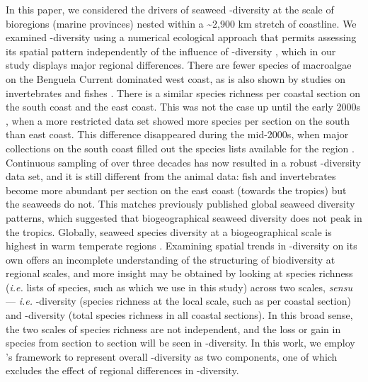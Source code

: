 \documentclass[utf8]{frontiersSCNS} %
\begin{document}
In this paper, we considered the drivers of seaweed \textbeta-diversity at the scale of bioregions (marine provinces) nested within a \textasciitilde{}2,900 km stretch of coastline. We examined \textbeta-diversity using a numerical ecological approach that permits assessing its spatial pattern independently of the influence of \textalpha-diversity \citep{Baselga2013}, which in our study displays major regional differences. There are fewer species of macroalgae on the Benguela Current dominated west coast, as is also shown by studies on invertebrates and fishes \citep{Thandar1989,Turpie2000}. There is a similar species richness per coastal section on the south coast and the east coast. This was not the case up until the early 2000s \citep{Bolton2002}, when a more restricted data set showed more species per section on the south than east coast. This difference disappeared during the mid-2000s, when major collections on the south coast filled out the species lists available for the region \citep{DeClerck2005}. Continuous sampling of over three decades has now resulted in a robust \textalpha-diversity data set, and it is still different from the animal data: fish and invertebrates become more abundant per section on the east coast (towards the tropics) but the seaweeds do not. This matches previously published global seaweed diversity patterns, which suggested that biogeographical seaweed diversity does not peak in the tropics. Globally, seaweed species diversity at a biogeographical scale is highest in warm temperate regions \citep{Bolton1994,Santelices2009chapter}. Examining spatial trends in \textalpha-diversity on its own offers an incomplete understanding of the structuring of biodiversity at regional scales, and more insight may be obtained by looking at species richness (\emph{i.e.} lists of species, such as which we use in this study) across two scales, \emph{sensu} \citet{Whittaker1972} --- \emph{i.e.} \textalpha-diversity (species richness at the local scale, such as per coastal section) and \textgamma-diversity (total species richness in all coastal sections). In this broad sense, the two scales of species richness are not independent, and the loss or gain in species from section to section will be seen in \textbeta-diversity. In this work, we employ \citet{Baselga2010}'s framework to represent overall \textbeta-diversity as two components, one of which excludes the effect of regional differences in \textalpha-diversity.
\end{document}
